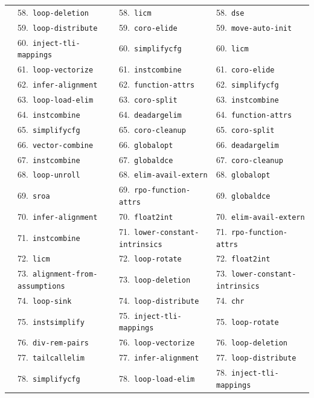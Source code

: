 \documentclass[11pt,a4paper]{article}
\begin{document}
{\begin{longtable}{llll}
 & 58.~\texttt{loop-deletion} & 58.~\texttt{licm} & 58.~\texttt{dse} \\
 & 59.~\texttt{loop-distribute} & 59.~\texttt{coro-elide} & 59.~\texttt{move-auto-init} \\
 & 60.~\texttt{inject-tli-mappings} & 60.~\texttt{simplifycfg} & 60.~\texttt{licm} \\
 & 61.~\texttt{loop-vectorize} & 61.~\texttt{instcombine} & 61.~\texttt{coro-elide} \\
 & 62.~\texttt{infer-alignment} & 62.~\texttt{function-attrs} & 62.~\texttt{simplifycfg} \\
 & 63.~\texttt{loop-load-elim} & 63.~\texttt{coro-split} & 63.~\texttt{instcombine} \\
 & 64.~\texttt{instcombine} & 64.~\texttt{deadargelim} & 64.~\texttt{function-attrs} \\
 & 65.~\texttt{simplifycfg} & 65.~\texttt{coro-cleanup} & 65.~\texttt{coro-split} \\
 & 66.~\texttt{vector-combine} & 66.~\texttt{globalopt} & 66.~\texttt{deadargelim} \\
 & 67.~\texttt{instcombine} & 67.~\texttt{globaldce} & 67.~\texttt{coro-cleanup} \\
 & 68.~\texttt{loop-unroll} & 68.~\texttt{elim-avail-extern} & 68.~\texttt{globalopt} \\
 & 69.~\texttt{sroa} & 69.~\texttt{rpo-function-attrs} & 69.~\texttt{globaldce} \\
 & 70.~\texttt{infer-alignment} & 70.~\texttt{float2int} & 70.~\texttt{elim-avail-extern} \\
 & 71.~\texttt{instcombine} & 71.~\texttt{lower-constant-intrinsics} & 71.~\texttt{rpo-function-attrs} \\
 & 72.~\texttt{licm} & 72.~\texttt{loop-rotate} & 72.~\texttt{float2int} \\
 & 73.~\texttt{alignment-from-assumptions} & 73.~\texttt{loop-deletion} & 73.~\texttt{lower-constant-intrinsics} \\
 & 74.~\texttt{loop-sink} & 74.~\texttt{loop-distribute} & 74.~\texttt{chr} \\
 & 75.~\texttt{instsimplify} & 75.~\texttt{inject-tli-mappings} & 75.~\texttt{loop-rotate} \\
 & 76.~\texttt{div-rem-pairs} & 76.~\texttt{loop-vectorize} & 76.~\texttt{loop-deletion} \\
 & 77.~\texttt{tailcallelim} & 77.~\texttt{infer-alignment} & 77.~\texttt{loop-distribute} \\
 & 78.~\texttt{simplifycfg} & 78.~\texttt{loop-load-elim} & 78.~\texttt{inject-tli-mappings} \\

\end{longtable}}
\end{document}
